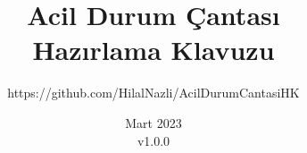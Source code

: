 \documentclass[openany]{book}
\begin{document}
\author{https://github.com/HilalNazli/AcilDurumCantasiHK}
\title{Acil Durum Çantası\\Hazırlama Klavuzu}
\date{Mart 2023\\v1.0.0}

\maketitle












\backmatter
\end{document}
